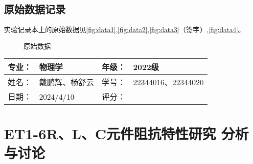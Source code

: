 \documentclass[dvipsnames, svgnames,a4paper,11pt]{article}
\begin{document}
	
	
	\clearpage
	\subsection{原始数据记录}
	实验记录本上的原始数据见\cref{fig:data1},\cref{fig:data2},\cref{fig:data3}（签字）,\cref{fig:data4}。

	\begin{figure}[htbp]
		\centering
		\quad
		\quad
		\quad
		\quad

		\caption{原始数据}
		\label{fig:original_data}
	\end{figure}
	
	
	
	
	
	
	
	\clearpage
	
	\begin{table}
		\renewcommand\arraystretch{1.7}
		\begin{tabularx}{\textwidth}{|X|X|X|X|}
			\hline
			专业：& 物理学 &年级：& 2022级\\
			\hline
			姓名： & 戴鹏辉、杨舒云 & 学号：& 22344016、22344020\\
			\hline
			日期：& 2024/4/10 & 评分： &\\
			\hline
		\end{tabularx}
	\end{table}
	
	\section{ET1-6\quad R、L、C元件阻抗特性研究 \quad\heiti 分析与讨论}
	
\end{document}
